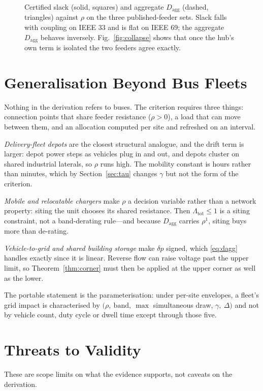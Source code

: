 \documentclass[lettersize,journal]{IEEEtran}
\newcommand{\Dagg}{D_{\mathrm{agg}}}
\newcommand{\Lamt}{\Lambda_{\mathrm{tot}}}
\begin{document}
\begin{figure}[!t]\centering

\caption{Certified slack (solid, squares) and aggregate $\Dagg$ (dashed,
triangles) against $\rho$ on the three published-feeder sets. Slack falls with
coupling on IEEE 33 and is flat on IEEE 69; the aggregate $\Dagg$ behaves
inversely. Fig.~\ref{fig:collapse} shows that once the hub's own term is
isolated the two feeders agree exactly.}
\label{fig:split}
\end{figure}

\section{Generalisation Beyond Bus Fleets}\label{sec:disc}
Nothing in the derivation refers to buses. The criterion requires three things:
connection points that share feeder resistance ($\rho>0$), a load that can move
between them, and an allocation computed per site and refreshed on an interval.

\emph{Delivery-fleet depots} are the closest structural analogue, and the drift
term is larger: depot power steps as vehicles plug in and out, and depots
cluster on shared industrial laterals, so $\rho$ runs high. The mobility
constant is hours rather than minutes, which by Section~\ref{sec:tau} changes
$\gamma$ but not the form of the criterion.

\emph{Mobile and relocatable chargers} make $\rho$ a decision variable rather
than a network property: siting the unit chooses its shared resistance. Then
$\Lamt\le 1$ is a siting constraint, not a band-derating rule---and because
$\Dagg$ carries $\rho^{1}$, siting buys more than de-rating.

\emph{Vehicle-to-grid and shared building storage} make $\delta p$ signed,
which \eqref{eq:dagg} handles exactly since it is linear. Reverse flow can
raise voltage past the upper limit, so Theorem~\ref{thm:corner} must then be
applied at the upper corner as well as the lower.

The portable statement is the parameterisation: under per-site envelopes, a
fleet's grid impact is characterised by $(\rho,\ \mathrm{band},\ \max$
simultaneous draw, $\gamma,\ \Delta)$ and not by vehicle count, duty cycle or
dwell time except through those five.

\section{Threats to Validity}\label{sec:threats}
These are scope limits on what the evidence supports, not caveats on the
derivation.
\end{document}
